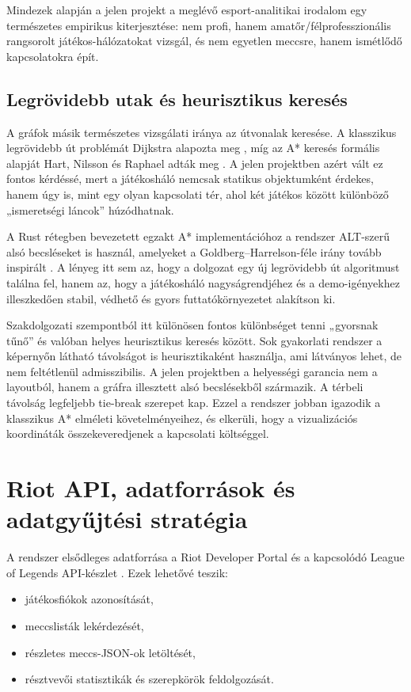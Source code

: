 ﻿\documentclass[a4paper,12pt]{report}
\begin{document}
Mindezek alapján a jelen projekt a meglévő esport-analitikai irodalom egy természetes empirikus kiterjesztése: nem profi, hanem amatőr/félprofesszionális rangsorolt játékos-hálózatokat vizsgál, és nem egyetlen meccsre, hanem ismétlődő kapcsolatokra épít.

\section{Legrövidebb utak és heurisztikus keresés}

A gráfok másik természetes vizsgálati iránya az útvonalak keresése. A klasszikus legrövidebb út problémát Dijkstra alapozta meg \cite{dijkstra1959}, míg az A* keresés formális alapját Hart, Nilsson és Raphael adták meg \cite{hart1968}. A jelen projektben azért vált ez fontos kérdéssé, mert a játékosháló nemcsak statikus objektumként érdekes, hanem úgy is, mint egy olyan kapcsolati tér, ahol két játékos között különböző „ismeretségi láncok” húzódhatnak.

A Rust rétegben bevezetett egzakt A* implementációhoz a rendszer ALT-szerű alsó becsléseket is használ, amelyeket a Goldberg--Harrelson-féle irány tovább inspirált \cite{goldberg2005}. A lényeg itt sem az, hogy a dolgozat egy új legrövidebb út algoritmust találna fel, hanem az, hogy a játékosháló nagyságrendjéhez és a demo-igényekhez illeszkedően stabil, védhető és gyors futtatókörnyezetet alakítson ki.

Szakdolgozati szempontból itt különösen fontos különbséget tenni „gyorsnak tűnő” és valóban helyes heurisztikus keresés között. Sok gyakorlati rendszer a képernyőn látható távolságot is heurisztikaként használja, ami látványos lehet, de nem feltétlenül admisszibilis. A jelen projektben a helyességi garancia nem a layoutból, hanem a gráfra illesztett alsó becslésekből származik. A térbeli távolság legfeljebb tie-break szerepet kap. Ezzel a rendszer jobban igazodik a klasszikus A* elméleti követelményeihez, és elkerüli, hogy a vizualizációs koordináták összekeveredjenek a kapcsolati költséggel.

\chapter{Riot API, adatforrások és adatgyűjtési stratégia}

A rendszer elsődleges adatforrása a Riot Developer Portal és a kapcsolódó League of Legends API-készlet \cite{riotportal,riotapi}. Ezek lehetővé teszik:

\begin{itemize}
    \item játékosfiókok azonosítását,
    \item meccslisták lekérdezését,
    \item részletes meccs-JSON-ok letöltését,
    \item résztvevői statisztikák és szerepkörök feldolgozását.
\end{itemize}
\end{document}

